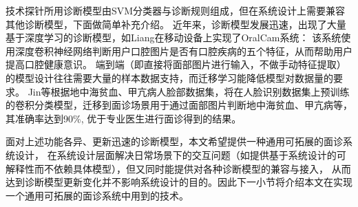 技术探针所用诊断模型由SVM分类器与诊断规则组成，但在系统设计上需要兼容其他诊断模型，下面做简单补充介绍。
近年来，诊断模型发展迅速，出现了大量基于深度学习的诊断模型，如Liang\cite{liang2020oralcam}在移动设备上实现了OralCam系统：
该系统使用深度卷积神经网络判断用户口腔图片是否有口腔疾病的五个特征，从而帮助用户提高口腔健康意识。
端到端（即直接将面部图片进行输入，不做手动特征提取）的模型设计往往需要大量的样本数据支持，而迁移学习能降低模型对数据量的要求。
Jin\cite{jin2020deep}等根据地中海贫血、甲亢病人脸部数据集，将在人脸识别数据集上预训练的卷积分类模型，迁移到面诊场景用于通过面部图片判断地中海贫血、甲亢病等，
其准确率达到90\%, 优于专业医生进行面诊得到的结果。

面对上述功能各异、更新迅速的诊断模型，本文希望提供一种通用可拓展的面诊系统设计，
在系统设计层面解决日常场景下的交互问题（如提供基于系统设计的可解释性而不依赖具体模型），但又同时能提供对各种诊断模型的兼容与接入，
从而达到诊断模型更新变化并不影响系统设计的目的。因此下一小节将介绍本文在实现一个通用可拓展的面诊系统中用到的技术。


%

